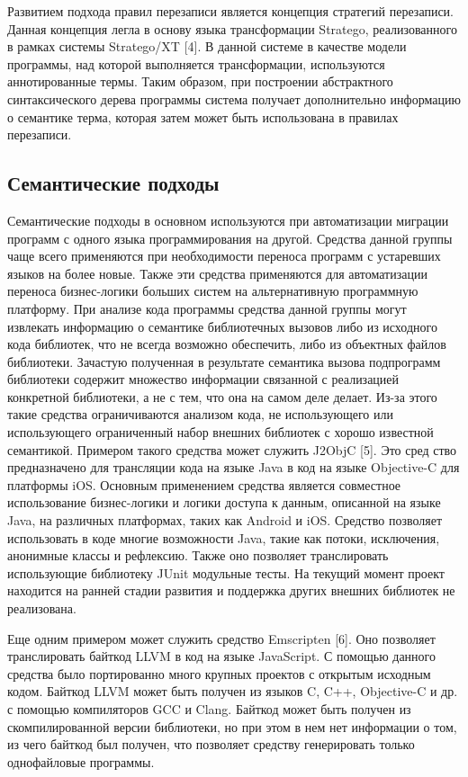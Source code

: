 Развитием подхода правил перезаписи является концепция стратегий перезаписи. Данная концепция легла в основу языка трансформации Stratego, реализованного в рамках системы Stratego/XT [4]. В данной системе в качестве модели программы, над которой выполняется трансформации, используются аннотированные термы. Таким образом, при построении абстрактного синтаксического дерева программы система получает дополнительно информацию о семантике терма, которая затем может быть использована в правилах перезаписи.

\subsection{Семантические подходы}
Семантические подходы в основном используются при автоматизации миграции программ с одного языка программирования на другой. Средства данной группы чаще всего применяются при необходимости переноса программ с устаревших языков на более новые. Также эти средства применяются для автоматизации переноса бизнес-логики больших систем на альтернативную программную платформу.
При анализе кода программы средства данной группы могут извлекать информацию о семантике библиотечных вызовов либо из исходного кода библиотек, что не всегда возможно обеспечить, либо из объектных файлов библиотеки. Зачастую полученная в результате семантика вызова подпрограмм библиотеки содержит множество информации связанной с реализацией конкретной библиотеки, а не с тем, что она на самом деле делает. Из-за этого такие средства ограничиваются анализом кода, не использующего или использующего ограниченный набор внешних библиотек с хорошо известной семантикой. Примером такого средства может служить J2ObjC [5]. Это сред ство предназначено для трансляции кода на языке Java в код на языке Objective-C для платформы iOS. Основным применением средства является совместное использование бизнес-логики и логики доступа к данным, описанной на языке Java, на различных платформах, таких как Android и iOS. Средство позволяет использовать в коде многие возможности Java, такие как потоки, исключения, анонимные классы и рефлексию. Также оно позволяет транслировать использующие библиотеку JUnit модульные тесты. На текущий момент проект находится на ранней стадии развития и поддержка других внешних библиотек
не реализована.

Еще одним примером может служить средство Emscripten [6]. Оно позволяет транслировать байткод LLVM в код на языке JavaScript. С помощью данного средства было портированно много крупных проектов с открытым исходным кодом. Байткод LLVM может быть получен из языков C, C++, Objective-C и др. с помощью компиляторов GCC и Clang. Байткод может быть получен из скомпилированной версии библиотеки, но при этом в нем нет информации о том, из чего байткод был получен, что позволяет средству генерировать только однофайловые программы.

